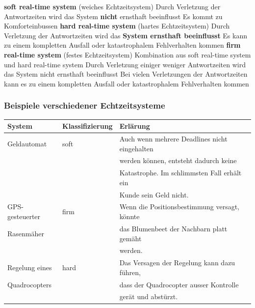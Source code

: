 \begin{outline}
    \1 \textbf{soft real-time system} (weiches Echtzeitsystem)
        \2 Durch Verletzung der Antwortzeiten wird das System \textbf{nicht} ernsthaft beeinflusst
        \2 Es kommt zu Komforteinbussen
    \1 \textbf{hard real-time system} (hartes Echtzeitsystem)
        \2 Durch Verletzung der Antwortzeiten wird das \textbf{System ernsthaft beeinflusst}
        \2 Es kann zu einem kompletten Ausfall oder katastrophalem Fehlverhalten kommen
    \1 \textbf{firm real-time system} (festes Echtzeitsystem)
        \2 Kombination aus soft real-time system und hard real-time system
        \2 Durch Verletzung einiger weniger Antwortzeiten wird das System nicht ernsthaft beeinflusst
        \2 Bei vielen Verletzungen der Antwortzeiten kann es zu einem kompletten Ausfall oder katastrophalem Fehlverhalten kommen
\end{outline}


\subsubsection{Beispiele verschiedener Echtzeitsysteme}

\begin{center}
    \begin{tabular}{@{}lll@{}}
        \toprule
        \textbf{System}     & \textbf{Klassifizierung}  & \textbf{Erlärung}                             \\
        \midrule
        Geldautomat         & soft                      & Auch wenn mehrere Deadlines nicht eingehalten \\
                            &                           & werden können, entsteht dadurch keine         \\
                            &                           & Katastrophe. Im schlimmsten Fall erhält ein   \\
                            &                           & Kunde sein Geld nicht.                        \\
        \midrule
        GPS-gesteuerter     & firm                      & Wenn die Positionsbestimmung versagt, könnte  \\
        Rasenmäher          &                           & das Blumenbeet der Nachbarn platt gemäht      \\
                            &                           & werden.                                       \\
        \midrule
        Regelung eines      & hard                      & Das Versagen der Regelung kann dazu führen,   \\
        Quadrocopters       &                           & dass der Quadrocopter ausser Kontrolle        \\
                            &                           & gerät und abstürzt.                           \\
        \bottomrule
    \end{tabular}
\end{center}



